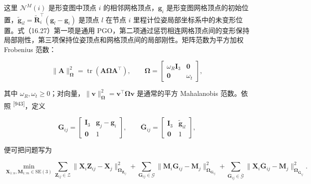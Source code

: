 这里 $\mathcal{N}^M(i)$ 是形变图中顶点 $i$ 的相邻网格顶点，$\boldsymbol{g}_i$ 是形变图网格顶点的初始位置，$\tilde{\boldsymbol{g}}_{il}=\tilde{\boldsymbol{R}}_i^{\top}(\boldsymbol{g}_l-\boldsymbol{g}_i)$ 是顶点 $l$ 在节点 $i$ 里程计位姿局部坐标系中的未变形位置。式（16.27）第一项是通用 PGO，第二项通过惩罚相连网格顶点间的变形保持局部刚性，第三项保持位姿顶点和网格顶点间的局部刚性。矩阵范数为平方加权 Frobenius 范数：

\begin{equation}
\|\boldsymbol{A}\|_{\boldsymbol{\Omega}}^2=\operatorname{tr}(\boldsymbol{A}\boldsymbol{\Omega}\boldsymbol{A}^{\top}),\qquad
\boldsymbol{\Omega}=\begin{bmatrix}\omega_R\boldsymbol{I}_3&\boldsymbol{0}\\\boldsymbol{0}&\omega_t\end{bmatrix},\tag{16.28}
\end{equation}

其中 $\omega_R,\omega_t\geq0$；对向量，$\|\boldsymbol{v}\|_{\boldsymbol{\Omega}}^2=\boldsymbol{v}^{\top}\boldsymbol{\Omega}\boldsymbol{v}$ 是通常的平方 Mahalanobis 范数。依照 \textsuperscript{[943]}，定义

\begin{equation}
\boldsymbol{G}_{ij}=\begin{bmatrix}\boldsymbol{I}_3&\boldsymbol{g}_j-\boldsymbol{g}_i\\\boldsymbol{0}&1\end{bmatrix},\qquad
\overline{\boldsymbol{G}}_{ij}=\begin{bmatrix}\boldsymbol{I}_3&\tilde{\boldsymbol{g}}_{il}\\\boldsymbol{0}&1\end{bmatrix},\tag{16.29}
\end{equation}

便可把问题写为

\begin{equation}
\min_{\boldsymbol{X}_{1:n},\boldsymbol{M}_{1:m}\in\mathrm{SE}(3)}
\sum_{\boldsymbol{Z}_{ij}\in\mathcal{Z}}\|\boldsymbol{X}_i\boldsymbol{Z}_{ij}-\boldsymbol{X}_j\|_{\boldsymbol{\Omega}_{\boldsymbol{Z}_{ij}}}^{2}
{}+\sum_{\boldsymbol{G}_{ij}\in\mathcal{G}}\|\boldsymbol{M}_i\boldsymbol{G}_{ij}-\boldsymbol{M}_j\|_{\boldsymbol{\Omega}_{\boldsymbol{G}_{ij}}}^{2}
{}+\sum_{\overline{\boldsymbol{G}}_{ij}\in\overline{\mathcal{G}}}\|\boldsymbol{X}_i\overline{\boldsymbol{G}}_{ij}-\boldsymbol{M}_j\|_{\boldsymbol{\Omega}_{\overline{\boldsymbol{G}}_{ij}}}^{2}.\tag{16.30}
\end{equation}

